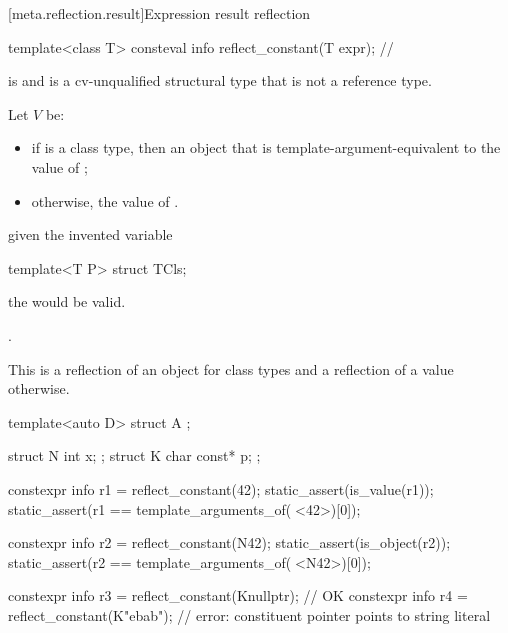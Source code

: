 [meta.reflection.result]{Expression result reflection}

%
\begin{itemdecl}
template<class T>
  consteval info reflect_constant(T expr);     // \expos
\end{itemdecl}

\begin{itemdescr}
\pnum
\mandates
{} is 
and  is a cv-unqualified structural type
that is not a reference type.

\pnum
Let $V$ be:
\begin{itemize}
\item
  if  is a class type,
  then an object that is template-argument-equivalent to the value of ;
\item
  otherwise, the value of .
\end{itemize}

\pnum
\constantwhen
given the invented variable
\begin{codeblock}
template<T P> struct TCls;
\end{codeblock}
the   would be valid.

\pnum
\returns
{}.
\begin{note}
This is a reflection of an object for class types
and a reflection of a value otherwise.
\end{note}
\begin{example}
\begin{codeblock}
template<auto D>
  struct A { };

struct N { int x; };
struct K { char const* p; };

constexpr info r1 = reflect_constant(42);
static_assert(is_value(r1));
static_assert(r1 == template_arguments_of(^^A<42>)[0]);

constexpr info r2 = reflect_constant(N{42});
static_assert(is_object(r2));
static_assert(r2 == template_arguments_of(^^A<N{42}>)[0]);

constexpr info r3 = reflect_constant(K{nullptr});   // OK
constexpr info r4 = reflect_constant(K{"ebab"});    // error: constituent pointer points to string literal
\end{codeblock}
\end{example}
\end{itemdescr}

